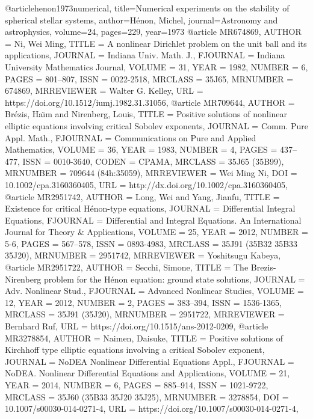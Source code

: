 @article{henon1973numerical,
  title={Numerical experiments on the stability of spherical stellar systems},
  author={H{\'e}non, Michel},
  journal={Astronomy and astrophysics},
  volume={24},
  pages={229},
  year={1973}
}
@article {MR674869,
    AUTHOR = {Ni, Wei Ming},
     TITLE = {A nonlinear {D}irichlet problem on the unit ball and its
              applications},
   JOURNAL = {Indiana Univ. Math. J.},
  FJOURNAL = {Indiana University Mathematics Journal},
    VOLUME = {31},
      YEAR = {1982},
    NUMBER = {6},
     PAGES = {801--807},
      ISSN = {0022-2518},
   MRCLASS = {35J65},
  MRNUMBER = {674869},
MRREVIEWER = {Walter G. Kelley},
       URL = {https://doi.org/10.1512/iumj.1982.31.31056},
}
@article {MR709644,
    AUTHOR = {Br{\'e}zis, Ha{\"{\i}}m and Nirenberg, Louis},
     TITLE = {Positive solutions of nonlinear elliptic equations involving
              critical {S}obolev exponents},
   JOURNAL = {Comm. Pure Appl. Math.},
  FJOURNAL = {Communications on Pure and Applied Mathematics},
    VOLUME = {36},
      YEAR = {1983},
    NUMBER = {4},
     PAGES = {437--477},
      ISSN = {0010-3640},
     CODEN = {CPAMA},
   MRCLASS = {35J65 (35B99)},
  MRNUMBER = {709644 (84h:35059)},
MRREVIEWER = {Wei Ming Ni},
       DOI = {10.1002/cpa.3160360405},
       URL = {http://dx.doi.org/10.1002/cpa.3160360405},
}
@article {MR2951742,
    AUTHOR = {Long, Wei and Yang, Jianfu},
     TITLE = {Existence for critical {H}\'enon-type equations},
   JOURNAL = {Differential Integral Equations},
  FJOURNAL = {Differential and Integral Equations. An International Journal
              for Theory \& Applications},
    VOLUME = {25},
      YEAR = {2012},
    NUMBER = {5-6},
     PAGES = {567--578},
      ISSN = {0893-4983},
   MRCLASS = {35J91 (35B32 35B33 35J20)},
  MRNUMBER = {2951742},
MRREVIEWER = {Yoshitsugu Kabeya},
}
@article {MR2951722,
    AUTHOR = {Secchi, Simone},
     TITLE = {The {B}rezis-{N}irenberg problem for the {H}\'enon equation:
              ground state solutions},
   JOURNAL = {Adv. Nonlinear Stud.},
  FJOURNAL = {Advanced Nonlinear Studies},
    VOLUME = {12},
      YEAR = {2012},
    NUMBER = {2},
     PAGES = {383--394},
      ISSN = {1536-1365},
   MRCLASS = {35J91 (35J20)},
  MRNUMBER = {2951722},
MRREVIEWER = {Bernhard Ruf},
       URL = {https://doi.org/10.1515/ans-2012-0209},
}
@article {MR3278854,
    AUTHOR = {Naimen, Daisuke},
     TITLE = {Positive solutions of {K}irchhoff type elliptic equations
              involving a critical {S}obolev exponent},
   JOURNAL = {NoDEA Nonlinear Differential Equations Appl.},
  FJOURNAL = {NoDEA. Nonlinear Differential Equations and Applications},
    VOLUME = {21},
      YEAR = {2014},
    NUMBER = {6},
     PAGES = {885--914},
      ISSN = {1021-9722},
   MRCLASS = {35J60 (35B33 35J20 35J25)},
  MRNUMBER = {3278854},
       DOI = {10.1007/s00030-014-0271-4},
       URL = {https://doi.org/10.1007/s00030-014-0271-4},
}
